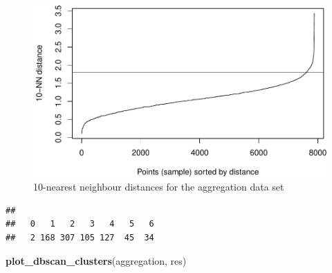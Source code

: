 \documentclass[]{book}
\newenvironment{Shaded}{\begin{snugshade}}{\end{snugshade}}
\newcommand{\KeywordTok}[1]{\textcolor[rgb]{0.13,0.29,0.53}{\textbf{{#1}}}}
\newcommand{\DataTypeTok}[1]{\textcolor[rgb]{0.13,0.29,0.53}{{#1}}}
\newcommand{\DecValTok}[1]{\textcolor[rgb]{0.00,0.00,0.81}{{#1}}}
\newcommand{\FloatTok}[1]{\textcolor[rgb]{0.00,0.00,0.81}{{#1}}}
\newcommand{\StringTok}[1]{\textcolor[rgb]{0.31,0.60,0.02}{{#1}}}
\newcommand{\NormalTok}[1]{{#1}}
\theoremstyle{definition}
\theoremstyle{definition}
\theoremstyle{definition}
\theoremstyle{remark}
\begin{document}
\begin{figure}

{\centering \includegraphics[width=0.75\linewidth]{09-clustering_files/figure-latex/aggregationKNNdist-1} 

}

\caption{10-nearest neighbour distances for the aggregation data set}\label{fig:aggregationKNNdist}
\end{figure}

\begin{Shaded}
\end{Shaded}

\begin{verbatim}
## 
##   0   1   2   3   4   5   6 
##   2 168 307 105 127  45  34
\end{verbatim}

\begin{Shaded}
\begin{Highlighting}[]
\KeywordTok{plot_dbscan_clusters}\NormalTok{(aggregation, res)}
\end{Highlighting}
\end{Shaded}
\end{document}
